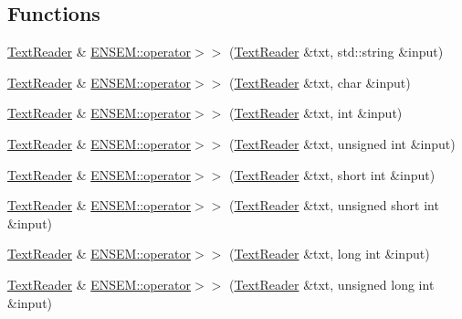 \subsection*{Functions}
\begin{DoxyCompactItemize}
\item 
\mbox{\hyperlink{classENSEM_1_1TextReader}{Text\+Reader}} \& \mbox{\hyperlink{group__io_ga03bd5b812dccb5e134a27e34c6e375bb}{E\+N\+S\+E\+M\+::operator$>$$>$}} (\mbox{\hyperlink{classENSEM_1_1TextReader}{Text\+Reader}} \&txt, std\+::string \&input)
\item 
\mbox{\hyperlink{classENSEM_1_1TextReader}{Text\+Reader}} \& \mbox{\hyperlink{group__io_ga4eecbfcd47e20672ad52ed41560f8573}{E\+N\+S\+E\+M\+::operator$>$$>$}} (\mbox{\hyperlink{classENSEM_1_1TextReader}{Text\+Reader}} \&txt, char \&input)
\item 
\mbox{\hyperlink{classENSEM_1_1TextReader}{Text\+Reader}} \& \mbox{\hyperlink{group__io_gab07a2169d63109c0bd1ec46e750bed16}{E\+N\+S\+E\+M\+::operator$>$$>$}} (\mbox{\hyperlink{classENSEM_1_1TextReader}{Text\+Reader}} \&txt, int \&input)
\item 
\mbox{\hyperlink{classENSEM_1_1TextReader}{Text\+Reader}} \& \mbox{\hyperlink{group__io_gac2f3c9587dbdd787bd2dfe5023813c67}{E\+N\+S\+E\+M\+::operator$>$$>$}} (\mbox{\hyperlink{classENSEM_1_1TextReader}{Text\+Reader}} \&txt, unsigned int \&input)
\item 
\mbox{\hyperlink{classENSEM_1_1TextReader}{Text\+Reader}} \& \mbox{\hyperlink{group__io_gad9337602901bc89db928ac4dc262e96f}{E\+N\+S\+E\+M\+::operator$>$$>$}} (\mbox{\hyperlink{classENSEM_1_1TextReader}{Text\+Reader}} \&txt, short int \&input)
\item 
\mbox{\hyperlink{classENSEM_1_1TextReader}{Text\+Reader}} \& \mbox{\hyperlink{group__io_ga371e4c7d2636c108da9fd5217e1532ce}{E\+N\+S\+E\+M\+::operator$>$$>$}} (\mbox{\hyperlink{classENSEM_1_1TextReader}{Text\+Reader}} \&txt, unsigned short int \&input)
\item 
\mbox{\hyperlink{classENSEM_1_1TextReader}{Text\+Reader}} \& \mbox{\hyperlink{group__io_ga7f8e9c81ef087d66a47d71decfc6456f}{E\+N\+S\+E\+M\+::operator$>$$>$}} (\mbox{\hyperlink{classENSEM_1_1TextReader}{Text\+Reader}} \&txt, long int \&input)
\item 
\mbox{\hyperlink{classENSEM_1_1TextReader}{Text\+Reader}} \& \mbox{\hyperlink{group__io_gadafd202db51d66c8ce03edc7a6cd1e0f}{E\+N\+S\+E\+M\+::operator$>$$>$}} (\mbox{\hyperlink{classENSEM_1_1TextReader}{Text\+Reader}} \&txt, unsigned long int \&input)
\item 

\end{DoxyCompactItemize}
